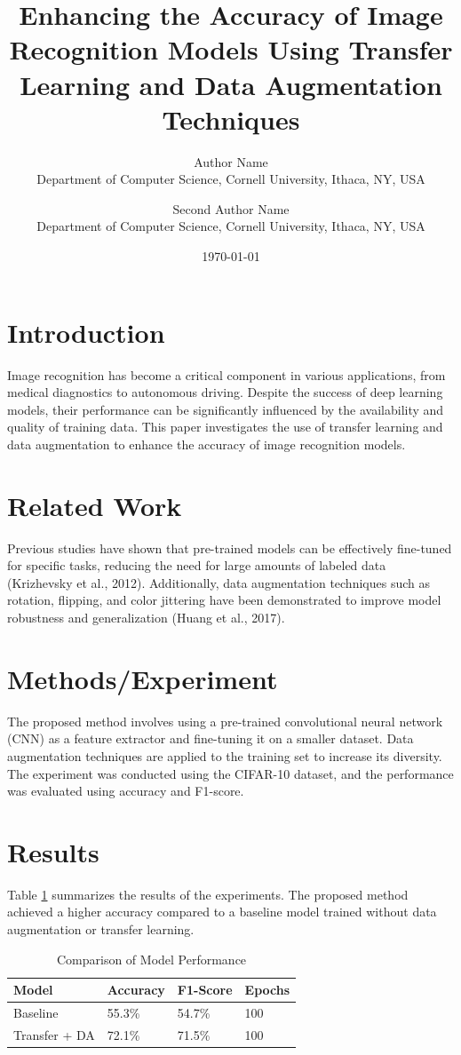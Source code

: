 \documentclass{article}
\title{Enhancing the Accuracy of Image Recognition Models Using Transfer Learning and Data Augmentation Techniques}
\author{Author Name \\
Department of Computer Science, Cornell University, Ithaca, NY, USA \\ 
\and Second Author Name \\
Department of Computer Science, Cornell University, Ithaca, NY, USA}
\date{\today}
\begin{document}
\maketitle

\section{Introduction}
Image recognition has become a critical component in various applications, from medical diagnostics to autonomous driving. Despite the success of deep learning models, their performance can be significantly influenced by the availability and quality of training data. This paper investigates the use of transfer learning and data augmentation to enhance the accuracy of image recognition models.

\section{Related Work}
Previous studies have shown that pre-trained models can be effectively fine-tuned for specific tasks, reducing the need for large amounts of labeled data (Krizhevsky et al., 2012). Additionally, data augmentation techniques such as rotation, flipping, and color jittering have been demonstrated to improve model robustness and generalization (Huang et al., 2017).

\section{Methods/Experiment}
The proposed method involves using a pre-trained convolutional neural network (CNN) as a feature extractor and fine-tuning it on a smaller dataset. Data augmentation techniques are applied to the training set to increase its diversity. The experiment was conducted using the CIFAR-10 dataset, and the performance was evaluated using accuracy and F1-score.

\section{Results}
Table \ref{tab:results} summarizes the results of the experiments. The proposed method achieved a higher accuracy compared to a baseline model trained without data augmentation or transfer learning.

\begin{table}[ht]
\centering
\caption{Comparison of Model Performance}
\label{tab:results}
\begin{tabular}{@{}llll@{}}
\toprule
\textbf{Model} & \textbf{Accuracy} & \textbf{F1-Score} & \textbf{Epochs} \\ \midrule
Baseline & 55.3\% & 54.7\% & 100 \\
Transfer + DA & 72.1\% & 71.5\% & 100 \\ \bottomrule
\end{tabular}
\end{table}
\end{document}
